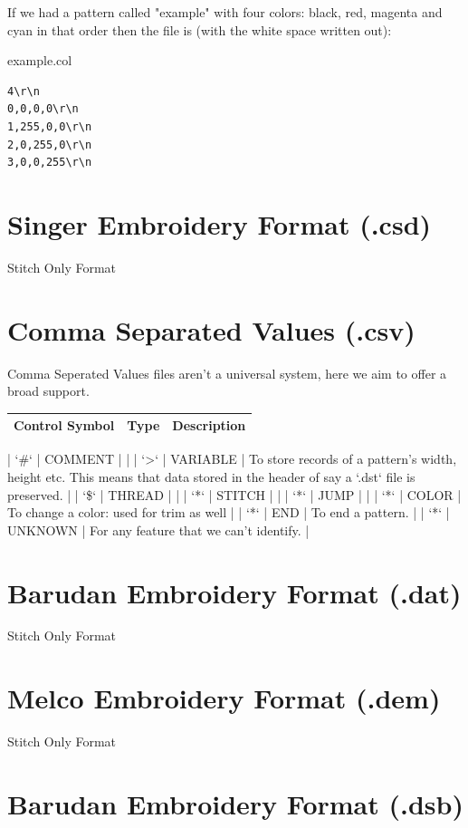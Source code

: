 \documentclass{report}
\begin{document}
If we had a pattern called "example" with four colors: black, red, magenta and cyan in that order then the file is (with the white space written out):

example.col

\begin{verbatim}
4\r\n
0,0,0,0\r\n
1,255,0,0\r\n
2,0,255,0\r\n
3,0,0,255\r\n
\end{verbatim}

\section{Singer Embroidery Format (.csd)}

Stitch Only Format

\section{Comma Separated Values (.csv)}

Comma Seperated Values files aren't a universal system, here we aim to
offer a broad support.

\begin{tabular}{l l l}
Control Symbol & Type & Description \\
\hline
\end{tabular}

| `\#` | COMMENT | |
| `>` | VARIABLE | To store records of a pattern's width, height etc. This means that data stored in the header of say a `.dst` file is preserved. |
| `\$` | THREAD | |
| `*` | STITCH | |
| `*` | JUMP | |
| `*` | COLOR | To change a color: used for trim as well |
| `*` | END | To end a pattern. |
| `*` | UNKNOWN | For any feature that we can't identify. |

\section{Barudan Embroidery Format (.dat)}

Stitch Only Format

\section{Melco Embroidery Format (.dem)}

Stitch Only Format

\section{Barudan Embroidery Format (.dsb)}
\end{document}
